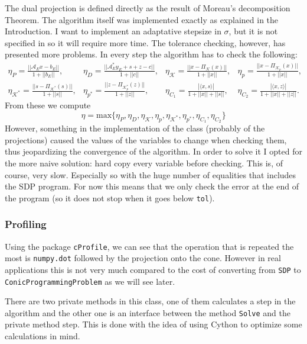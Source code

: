 \documentclass[paper=a4, fontsize=11pt]{scrartcl}
\numberwithin{equation}{section}		%
\numberwithin{figure}{section}			%
\numberwithin{table}{section}				%
\begin{document}
The dual projection is defined directly as the result of Moreau's decomposition Theorem.
The algorithm itself was implemented exactly as explained in the Introduction. I want to implement an adaptative stepsize in $\sigma$, but it is not specified in \cite{sun2014} so it will require more time. The tolerance checking, however, has presented more problems. In every step the algorithm has to check the following:
\begin{align*}
\eta_P = \frac{||\mathcal{A}_Ex-b_E||}{1+||b_E||},&\eta_D=\frac{||\mathcal{A}_E^*y_E+s+z-c||}{1+||c||},&\eta_\mathcal{K}=\frac{||x-\Pi_{\mathcal{K}}(x)||}{1+||x||},&\eta_p = \frac{||x-\Pi_{\mathcal{K}_p}(x)||}{1+||x||},&\\
\eta_{\mathcal{K}^*} = \frac{||s-\Pi_{\mathcal{K^*}}(s)||}{1+||s||},&\eta_{p^*} = \frac{||z - \Pi_{\mathcal{K}_p^*}(z)||}{1+||z||},&\eta_{C_1} = \frac{|\langle x,s \rangle|}{1+||x|| +||s||},&\eta_{C_2} = \frac{|\langle x,z \rangle |}{1+||x|| +||z||}.&
\end{align*}
From these we compute $$\eta = \text{max}\{\eta_P,\eta_D,\eta_{\mathcal{K}},\eta_p,\eta_{\mathcal{K}^*}, \eta_{p^*}, \eta_{C_1},\eta_{C_2}\}$$
However, something in the implementation of the class (probably of the projections) caused the values of the variables to change when checking them, thus jeopardizing the convergence of the algorithm. In order to solve it I opted for the more naive solution: hard copy every variable before checking. This is, of course, very slow. Especially so with the huge number of equalities that includes the SDP program. For now this means that we only check the error at the end of the program (so it does not stop when it goes below \texttt{tol}). 
\subsubsection{Profiling}
Using the package \texttt{cProfile}, we can see that the operation that is repeated the most is \texttt{numpy.dot} followed by the projection onto the cone. However in real applications this is not very much compared to the cost of converting from \texttt{SDP} to \texttt{ConicProgrammingProblem} as we will see later.

There are two private methods in this class, one of them calculates a step in the algorithm and the other one is an interface between the method \texttt{Solve} and the private method step. This is done with the idea of using Cython to optimize some calculations in mind.
\end{document}
